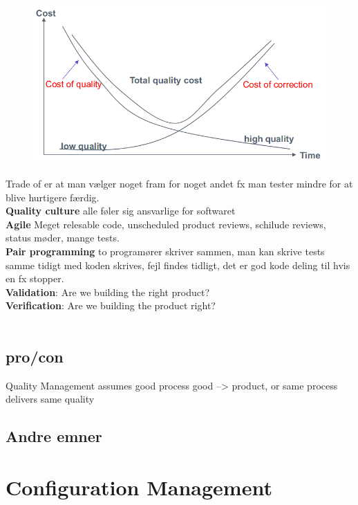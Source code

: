 \documentclass[11pt,a4paper]{article}
\begin{document}
\begin{figure}[h!]
\includegraphics[scale=1]{quality-mang.png}
\end{figure}

Trade of er at man vælger noget fram for noget andet fx man tester mindre for at blive hurtigere færdig.\\
\textbf{Quality culture} alle føler sig ansvarlige for softwaret\\
\textbf{Agile} Meget relesable code, unscheduled product reviews, schilude reviews, status møder, mange tests.\\
\textbf{Pair programming} to programører skriver sammen, man kan skrive tests samme tidigt med koden skrives, fejl findes tidligt, det er god kode deling til hvis en fx stopper.\\
\textbf{Validation}: Are we building the right product?\\
\textbf{Verification}: Are we building the product right?\\\\

\subsection{pro/con}
Quality Management assumes good process  good --> product, or same process delivers same quality
\subsection{Andre emner}
\newpage
\section{Configuration Management}
\end{document}
